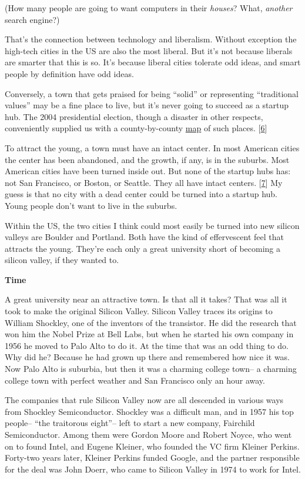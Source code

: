 (How many people are going to want computers in their \emph{houses}?
What, \emph{another} search engine?)

That's the connection between technology and liberalism. Without
exception the high-tech cities in the US are also the most liberal. But
it's not because liberals are smarter that this is so. It's because
liberal cities tolerate odd ideas, and smart people by definition have
odd ideas.

Conversely, a town that gets praised for being ``solid'' or representing
``traditional values'' may be a fine place to live, but it's never going
to succeed as a startup hub. The 2004 presidential election, though a
disaster in other respects, conveniently supplied us with a
county-by-county
\href{http://www-personal.umich.edu/~mejn/election/2004/countymaplinearlarge.png}{map}
of such places. {[}\hyperref[f6n]{6}{]}

To attract the young, a town must have an intact center. In most
American cities the center has been abandoned, and the growth, if any,
is in the suburbs. Most American cities have been turned inside out. But
none of the startup hubs has: not San Francisco, or Boston, or Seattle.
They all have intact centers. {[}\hyperref[f7n]{7}{]} My guess is that
no city with a dead center could be turned into a startup hub. Young
people don't want to live in the suburbs.

Within the US, the two cities I think could most easily be turned into
new silicon valleys are Boulder and Portland. Both have the kind of
effervescent feel that attracts the young. They're each only a great
university short of becoming a silicon valley, if they wanted to.

\textbf{Time}

A great university near an attractive town. Is that all it takes? That
was all it took to make the original Silicon Valley. Silicon Valley
traces its origins to William Shockley, one of the inventors of the
transistor. He did the research that won him the Nobel Prize at Bell
Labs, but when he started his own company in 1956 he moved to Palo Alto
to do it. At the time that was an odd thing to do. Why did he? Because
he had grown up there and remembered how nice it was. Now Palo Alto is
suburbia, but then it was a charming college town-- a charming college
town with perfect weather and San Francisco only an hour away.

The companies that rule Silicon Valley now are all descended in various
ways from Shockley Semiconductor. Shockley was a difficult man, and in
1957 his top people-- ``the traitorous eight''-- left to start a new
company, Fairchild Semiconductor. Among them were Gordon Moore and
Robert Noyce, who went on to found Intel, and Eugene Kleiner, who
founded the VC firm Kleiner Perkins. Forty-two years later, Kleiner
Perkins funded Google, and the partner responsible for the deal was John
Doerr, who came to Silicon Valley in 1974 to work for Intel.


